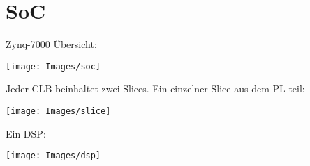 \section{SoC}
Zynq-7000 Übersicht:
\begin{center}
	\texttt{[image: Images/soc]}
\end{center}

Jeder CLB beinhaltet zwei Slices.
Ein einzelner Slice aus dem PL teil:
\begin{center}
	\texttt{[image: Images/slice]}
\end{center}

Ein DSP:
\begin{center}
	\texttt{[image: Images/dsp]}
\end{center}


